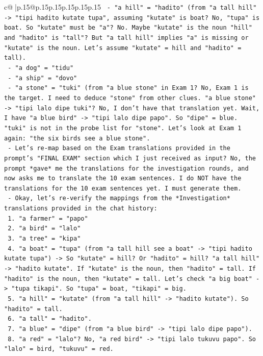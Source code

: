 \documentclass{article}
\begin{document}
{\begin{supertabular}{c@{$\;$}|p{.15\linewidth}@{}p{.15\linewidth}p{.15\linewidth}p{.15\linewidth}p{.15\linewidth}p{.15\linewidth}}
{{{\texttt{    {-} "a hill" = "hadito" (from "a tall hill" {-}> "tipi hadito kutate tupa", assuming "kutate" is boat? No, "tupa" is boat. So "kutate" must be "a"? No. Maybe "kutate" is the noun "hill" and "hadito" is "tall"? But "a tall hill" implies "a" is missing or "kutate" is the noun. Let's assume "kutate" = hill and "hadito" = tall).} \\
\texttt{    {-} "a dog" = "tidu"} \\
\texttt{    {-} "a ship" = "dovo"} \\
\texttt{    {-} "a stone" = "tuki" (from "a blue stone" in Exam 1? No, Exam 1 is the target. I need to deduce "stone" from other clues. "a blue stone" {-}> "tipi lalo dipe tuki"? No, I don't have that translation yet. Wait, I have "a blue bird" {-}> "tipi lalo dipe papo". So "dipe" = blue. "tuki" is not in the probe list for "stone". Let's look at Exam 1 again: "the six birds see a blue stone".} \\
\texttt{    {-} Let's re{-}map based on the Exam translations provided in the prompt's "FINAL EXAM" section which I just received as input? No, the prompt *gave* me the translations for the investigation rounds, and now asks me to translate the 10 exam sentences. I do NOT have the translations for the 10 exam sentences yet. I must generate them.} \\
\texttt{    {-} Okay, let's re{-}verify the mappings from the *Investigation* translations provided in the chat history:} \\
\texttt{      1. "a farmer" = "papo"} \\
\texttt{      2. "a bird" = "lalo"} \\
\texttt{      3. "a tree" = "kipa"} \\
\texttt{      4. "a boat" = "tupa" (from "a tall hill see a boat" {-}> "tipi hadito kutate tupa") {-}> So "kutate" = hill? Or "hadito" = hill? "a tall hill" {-}> "hadito kutate". If "kutate" is the noun, then "hadito" = tall. If "hadito" is the noun, then "kutate" = tall. Let's check "a big boat" {-}> "tupa tikapi". So "tupa" = boat, "tikapi" = big.} \\
\texttt{      5. "a hill" = "kutate" (from "a tall hill" {-}> "hadito kutate"). So "hadito" = tall.} \\
\texttt{      6. "a tall" = "hadito".} \\
\texttt{      7. "a blue" = "dipe" (from "a blue bird" {-}> "tipi lalo dipe papo").} \\
\texttt{      8. "a red" = "lalo"? No, "a red bird" {-}> "tipi lalo tukuvu papo". So "lalo" = bird, "tukuvu" = red.} \\
}}}
\end{supertabular}}
\end{document}
